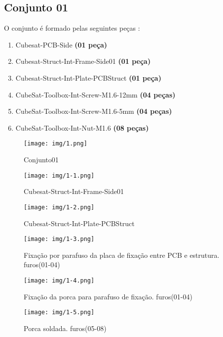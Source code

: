 
\subsection{Conjunto 01}\label{subs:c01}

O conjunto é formado pelas seguintes peças :

\begin{enumerate}[label*=\ref*{subs:c01}\arabic*]
	\item Cubesat-PCB-Side \textbf{(01 peça)}
	\item Cubesat-Struct-Int-Frame-Side01 \textbf{(01 peça)}
	\item Cubesat-Struct-Int-Plate-PCBStruct \textbf{(01 peça)}
	\item CubeSat-Toolbox-Int-Screw-M1.6-12mm \textbf{(04 peças)}
	\item CubeSat-Toolbox-Int-Screw-M1.6-5mm \textbf{(04 peças)}
	\item CubeSat-Toolbox-Int-Nut-M1.6 \textbf{(08 peças)}
\end{enumerate}

\begin{figure}[ht!]
	\centering
	\texttt{[image: img/1.png]}
	\caption{Conjunto01}
	\label{1}
\end{figure}

\begin{figure}[ht!]
	\centering
	\texttt{[image: img/1-1.png]}
	\caption{Cubesat-Struct-Int-Frame-Side01}
	\label{1-1}
\end{figure}

\begin{figure}[ht!]
	\centering
	\texttt{[image: img/1-2.png]}
	\caption{Cubesat-Struct-Int-Plate-PCBStruct}
	\label{1-2}
\end{figure}

\begin{figure}[ht!]
	\centering
	\texttt{[image: img/1-3.png]}
	\caption{Fixação por parafuso da placa de fixação entre PCB e estrutura. furos(01-04)}
	\label{1-3}
\end{figure}

\begin{figure}[ht!]
	\centering
	\texttt{[image: img/1-4.png]}
	\caption{Fixação da porca para parafuso de fixação. furos(01-04)}
	\label{1-4}
\end{figure}

\begin{figure}[ht!]
	\centering
	\texttt{[image: img/1-5.png]}
	\caption{Porca soldada. furos(05-08)}
	\label{1-5}
\end{figure}

